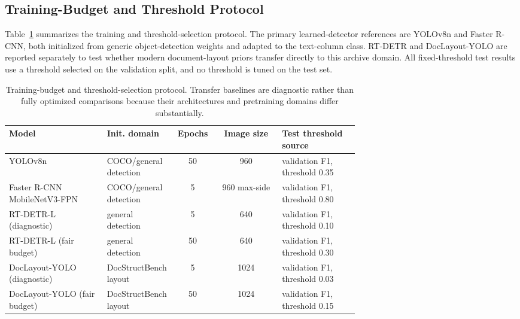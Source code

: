 \documentclass[12pt]{article}
\begin{document}
\subsection{Training-Budget and Threshold Protocol}
Table~\ref{tab:training_protocol} summarizes the training and threshold-selection protocol. The primary learned-detector references are YOLOv8n and Faster R-CNN, both initialized from generic object-detection weights and adapted to the text-column class. RT-DETR and DocLayout-YOLO are reported separately to test whether modern document-layout priors transfer directly to this archive domain. All fixed-threshold test results use a threshold selected on the validation split, and no threshold is tuned on the test set.

\begin{table}[t]
\centering
\scriptsize\setlength{\tabcolsep}{3pt}
\caption{Training-budget and threshold-selection protocol. Transfer baselines are diagnostic rather than fully optimized comparisons because their architectures and pretraining domains differ substantially.}
\label{tab:training_protocol}
\begin{tabular}{p{0.28\linewidth}p{0.18\linewidth}ccp{0.22\linewidth}}
\toprule
Model & Init. domain & Epochs & Image size & Test threshold source \\
\midrule
YOLOv8n & COCO/general detection & 50 & 960 & validation F1, threshold 0.35 \\
Faster R-CNN MobileNetV3-FPN & COCO/general detection & 5 & 960 max-side & validation F1, threshold 0.80 \\
RT-DETR-L (diagnostic) & general detection & 5 & 640 & validation F1, threshold 0.10 \\
RT-DETR-L (fair budget) & general detection & 50 & 640 & validation F1, threshold 0.30 \\
DocLayout-YOLO (diagnostic) & DocStructBench layout & 5 & 1024 & validation F1, threshold 0.03 \\
DocLayout-YOLO (fair budget) & DocStructBench layout & 50 & 1024 & validation F1, threshold 0.15 \\
\bottomrule
\end{tabular}
\end{table}
\end{document}
